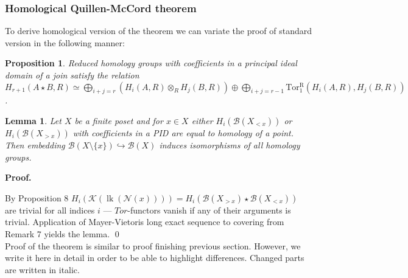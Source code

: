 \documentclass[a4paper, 12pt]{article}
\newtheorem{proposition}{Proposition}
\newtheorem{lemma}{Lemma}
\theoremstyle{definition}
\theoremstyle{remark}
\newenvironment{pf}{\noindent\textbf{Proof.}}{\qed}
\begin{document}
\subsubsection{Homological Quillen-McCord theorem}

To derive homological version of the theorem we can variate the proof of standard version in the following manner:\\

\begin{proposition} {\cite[Lemma 2.1]{Milnor56}}
  Reduced homology groups with coefficients in a principal ideal domain of a join satisfy the relation
  $H_{r+1}(A \star B, R) \simeq \bigoplus_{i+j=r}(H_i(A,R) \otimes_R H_j(B,R)) \oplus \bigoplus_{i+j=r-1} \operatorname{Tor_1^R}(H_i(A,R),H_j(B,R))$.
\end{proposition}

\begin{lemma}
  Let $X$ be a finite poset and for $x \in X$ either $H_i(\mathcal{B}(X_{< x}))$ or $H_i(\mathcal{B}(X_{> x}))$ with coefficients in a PID are equal to homology of a point. Then embedding $\mathcal{B}(X \setminus \{x\}) \hookrightarrow \mathcal{B}(X)$ induces isomorphisms of all homology groups.
\end{lemma}

\begin{pf} ~ \par
  By Proposition 8 $H_i(\mathcal{K}(\operatorname{lk}(\mathcal{N}(x)))) = H_i(\mathcal{B}(X_{>x}) \star \mathcal{B}(X_{<x}))$ are trivial for all indices $i$ --- $Tor$-functors vanish if any of their arguments is trivial.
  Application of Mayer-Vietoris long exact sequence to covering from Remark 7 yields the lemma.
\end{pf}\\

Proof of the theorem is similar to proof finishing previous section. However, we write it here in detail in order to be able to highlight differences. Changed parts are written in italic.\\
\end{document}

